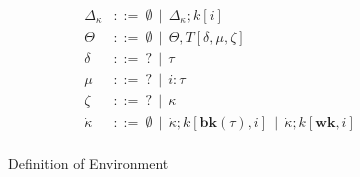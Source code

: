 \begin{figure*}[htb!]
\begin{align*}
	\Delta_{\kappa} &::=~ \emptyset ~~ | ~~ \Delta_{\kappa};k[i]\\
	\Theta &::=~ \emptyset ~~ | ~~ \Theta,T[\delta,\mu,\zeta] \\
	\delta &::=~ ? ~~ | ~~ \tau\\
	\mu	   &::=~ ? ~~ | ~~ i:\tau\\
	\zeta  &::=~ ? ~~ | ~~ \kappa\\
	\dot\kappa        &::=~ \emptyset ~~ | ~~ \dot\kappa;k[\mathbf{bk}(\tau),i] ~~ | ~~ \dot\kappa;k[\mathbf{wk},i]\\
\end{align*}
\caption{Definition of Environment}
\label{typechecking-environment}
\end{figure*}